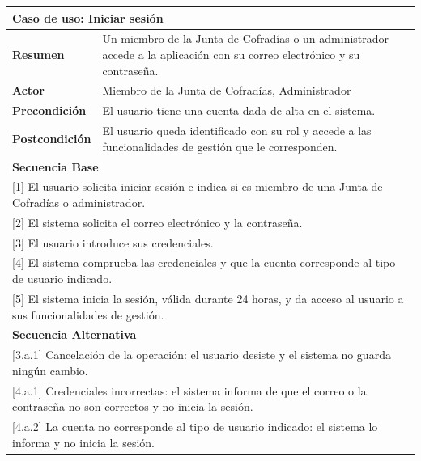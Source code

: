 \begin{table}[h!]
    \centering
    \renewcommand{\arraystretch}{1.5}

    \begin{tabular}{|p{4cm}|p{11cm}|}
        \hline
        \multicolumn{2}{|l|}{\textbf{Caso de uso: Iniciar sesión}} \\
        \hline
        \textbf{Resumen} & Un miembro de la Junta de Cofradías o un administrador accede a la aplicación con su correo electrónico y su contraseña. \\
        \hline
        \textbf{Actor} & Miembro de la Junta de Cofradías, Administrador \\
        \hline
        \textbf{Precondición} & El usuario tiene una cuenta dada de alta en el sistema. \\
        \hline
        \textbf{Postcondición} & El usuario queda identificado con su rol y accede a las funcionalidades de gestión que le corresponden. \\
        \hline
        \multicolumn{2}{|l|}{\textbf{Secuencia Base}} \\
        \hline
        \multicolumn{2}{|p{15cm}|}{ [1] El usuario solicita iniciar sesión e indica si es miembro de una Junta de Cofradías o administrador. } \\
        \hline
        \multicolumn{2}{|p{15cm}|}{ [2] El sistema solicita el correo electrónico y la contraseña. } \\
        \hline
        \multicolumn{2}{|p{15cm}|}{ [3] El usuario introduce sus credenciales. } \\
        \hline
        \multicolumn{2}{|p{15cm}|}{ [4] El sistema comprueba las credenciales y que la cuenta corresponde al tipo de usuario indicado. } \\
        \hline
        \multicolumn{2}{|p{15cm}|}{ [5] El sistema inicia la sesión, válida durante 24 horas, y da acceso al usuario a sus funcionalidades de gestión. } \\
        \hline
        \multicolumn{2}{|l|}{\textbf{Secuencia Alternativa}} \\
        \hline
        \multicolumn{2}{|p{15cm}|}{ [3.a.1] Cancelación de la operación: el usuario desiste y el sistema no guarda ningún cambio. } \\
        \hline
        \multicolumn{2}{|p{15cm}|}{ [4.a.1] Credenciales incorrectas: el sistema informa de que el correo o la contraseña no son correctos y no inicia la sesión. } \\
        \hline
        \multicolumn{2}{|p{15cm}|}{ [4.a.2] La cuenta no corresponde al tipo de usuario indicado: el sistema lo informa y no inicia la sesión. } \\

\end{tabular}
\end{table}
